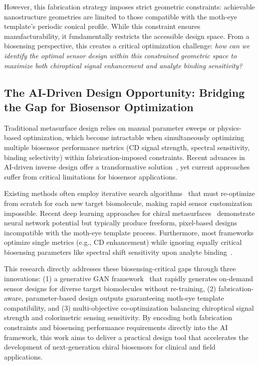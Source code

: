 \documentclass[12pt,a4paper]{article}
\begin{document}
However, this fabrication strategy imposes strict geometric constraints: achievable nanostructure geometries are limited to those compatible with the moth-eye template's periodic conical profile. While this constraint ensures manufacturability, it fundamentally restricts the accessible design space. From a biosensing perspective, this creates a critical optimization challenge: \textit{how can we identify the optimal sensor design within this constrained geometric space to maximize both chiroptical signal enhancement and analyte binding sensitivity?}

\subsection{The AI-Driven Design Opportunity: Bridging the Gap for Biosensor Optimization}
Traditional metasurface design relies on manual parameter sweeps or physics-based optimization, which become intractable when simultaneously optimizing multiple biosensor performance metrics (CD signal strength, spectral sensitivity, binding selectivity) within fabrication-imposed constraints. Recent advances in AI-driven inverse design offer a transformative solution~\cite{dl_nanophotonics_researching,ai_metasurface_vae_gan}, yet current approaches suffer from critical limitations for biosensor applications.

Existing methods often employ iterative search algorithms~\cite{ml_metaplasmonic_biosensors} that must re-optimize from scratch for each new target biomolecule, making rapid sensor customization impossible. Recent deep learning approaches for chiral metasurfaces~\cite{nn_chiral_nanodimer} demonstrate neural network potential but typically produce freeform, pixel-based designs incompatible with the moth-eye template process. Furthermore, most frameworks optimize single metrics (e.g., CD enhancement) while ignoring equally critical biosensing parameters like spectral shift sensitivity upon analyte binding~\cite{nn_chiral_nanodimer}.

This research directly addresses these biosensing-critical gaps through three innovations: (1) a generative GAN framework~\cite{conditional_gan_nanophotonics,generative_metasurface_umbc} that rapidly generates on-demand sensor designs for diverse target biomolecules without re-training, (2) fabrication-aware, parameter-based design outputs guaranteeing moth-eye template compatibility, and (3) multi-objective co-optimization balancing chiroptical signal strength and colorimetric sensing sensitivity. By encoding both fabrication constraints and biosensing performance requirements directly into the AI framework, this work aims to deliver a practical design tool that accelerates the development of next-generation chiral biosensors for clinical and field applications.
\end{document}
